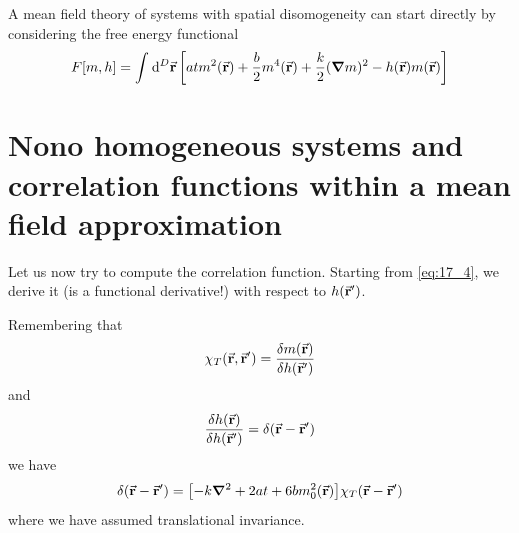 \documentclass[../main/main.tex]{subfiles}
\begin{document}
 \begin{remark}
 A mean field theory of systems with spatial disomogeneity can start directly by considering the free energy functional
 \begin{equation}
   F[m,h] = \int_{}^{} \dd[D]{\va{r}} \qty[a t m^2 (\va{r}) + \frac{b}{2} m^4 (\va{r}) + \frac{k}{2} (\grad m)^2 - h (\va{r}) m(\va{r})]
 \end{equation}
 \end{remark}

\section{Nono homogeneous systems and correlation functions within a mean field approximation}
Let us now try to compute the correlation function. Starting from \eqref{eq:17_4}, we derive it (is a functional derivative!) with respect to \( h (\va{r}')\).

Remembering that
\begin{equation}
  \chi _T (\va{r},\va{r}') = \frac{\delta m(\va{r})}{\delta h (\va{r}')}
\end{equation}
and
\begin{equation}
  \frac{\delta h (\va{r})}{\delta h (\va{r}')} = \delta (\va{r}-\va{r}')
\end{equation}
we have
\begin{equation}
  \delta  (\va{r} - \va{r}')  = \qty[- k \grad ^2 + 2 a t    + 6 b m_0^2 (\va{r}) ] \chi _T (\va{r}-\va{r}')
\end{equation}
where we have assumed translational invariance.
\end{document}
